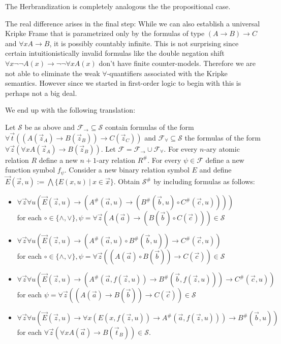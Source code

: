 \documentclass[a4paper,UKenglish,cleveref, autoref, thm-restate]{lipics-v2021}
\begin{document}
The Herbrandization is completely analogous the the propositional case.

The real difference arises in the final step: While we can also establish a universal Kripke Frame that is parametrized only by the formulas of type $(A\to B)\to C$ and $\forall xA\to B$, it is possibly countably infinite. This is not surprising since certain intuitionistically invalid formulas like the double negation shift $\forall x\neg\neg A(x)\to \neg\neg\forall x A(x)$ don't have finite counter-models. Therefore we are not able to eliminate the weak $\forall$-quantifiers associated with the Kripke semantics. However since we started in first-order logic to begin with this is perhaps not a big deal.

We end up with the following translation:

\begin{theorem}\label{fullFOtranslation}
	Let $\mathcal S$ be as above and $\mathcal F_\to\subseteq\mathcal S$ contain formulas of the form $\forall \vec t((A(\vec z_A)\to B(\vec z_B))\to C(\vec z_C))$ and $\mathcal F_\forall\subseteq\mathcal S$ the formulas of the form $\forall \vec z(\forall xA(\vec z_A)\to B(\vec z_B))$. Let $\mathcal F = \mathcal F_\to\cup\mathcal F_\forall$. For every $n$-ary atomic relation $R$ define a new $n+1$-ary relation $R^\#$. For every $\psi\in\mathcal F$ define a new function symbol $f_\psi$. Consider a new binary relation symbol $E$ and define $\vec E(\vec x, u) := \bigwedge\{E(x, u)\:|\:x\in\vec x\}$. Obtain $\mathcal S^\#$ by including formulas as follows:
	\begin{itemize}
		\item $\forall \vec z\forall u(\vec E(\vec z, u)\to (A^\#(\vec a, u)\to (B^\#(\vec b, u)\circ C^\#(\vec c, u))))$\\for each $\circ\in\{\wedge, \vee\}, \psi = \forall \vec z(A(\vec a)\to (B(\vec b)\circ C(\vec c)))\in\mathcal S$
		\item $\forall \vec z\forall u(\vec E(\vec z, u)\to (A^\#(\vec a, u)\circ B^\#(\vec b, u))\to C^\#(\vec c, u))$\\for each $\circ\in\{\wedge, \vee\}, \psi = \forall \vec z((A(\vec a)\circ B(\vec b))\to C(\vec c))\in\mathcal S$
		\item $\forall \vec z\forall u(\vec E(\vec z, u)\to(A^\#(\vec a, f(\vec z, u))\to B^\#(\vec b, f(\vec z, u)))\to C^\#(\vec c, u))$ for each $\psi = \forall \vec z((A(\vec a)\to B(\vec b))\to C(\vec c))\in\mathcal S$
		\item  $\forall \vec z\forall u(\vec E(\vec z, u)\to \forall x(E(x, f(\vec z, u))\to A^\#(\vec a, f(\vec z, u)))\to B^\#(\vec b, u))$\\for each $\forall \vec z(\forall xA(\vec a)\to B(\vec t_B))\in\mathcal S$.

\end{itemize}
\end{theorem}
\end{document}
